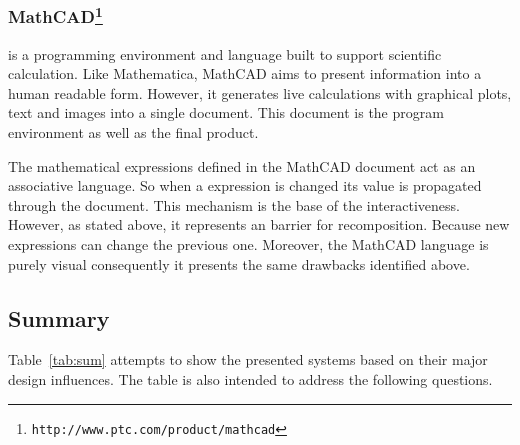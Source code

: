 \subsubsection{MathCAD\protect\footnote{\texttt{http://www.ptc.com/product/mathcad}}} is a programming environment and language built to support scientific calculation. Like Mathematica, MathCAD aims to present information into a human readable form. However, it generates live calculations with graphical plots, text and images into a single document. This document is the program environment as well as the final product.

The mathematical expressions defined in the MathCAD document act as an associative language. So when a expression is changed its value is propagated through the document. This mechanism is the base of the interactiveness. However, as stated above, it represents an barrier for recomposition. Because new expressions can change the previous one. Moreover, the MathCAD language is purely visual consequently it presents the same drawbacks identified above.

\subsection{Summary}

Table~\ref{tab:sum} attempts to show the presented systems based on their major design influences. The table is also intended to address the following questions.


